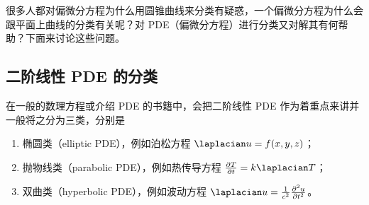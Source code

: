 
\begin{issues}
\issueMissDepend
\issueTODO
\issueDraft
\end{issues}

很多人都对偏微分方程为什么用圆锥曲线来分类有疑惑，一个偏微分方程为什么会跟平面上曲线的分类有关呢？对 PDE（偏微分方程）进行分类又对解其有何帮助？下面来讨论这些问题。

\subsection{二阶线性 PDE 的分类}
在一般的数理方程或介绍 PDE 的书籍中，会把二阶线性 PDE 作为着重点来讲并一般将之分为三类，分别是
\begin{enumerate}
\item 椭圆类（elliptic PDE），例如泊松方程 $\laplacian u = f(x,y,z)$；
\item 抛物线类（parabolic PDE），例如热传导方程 $\frac{\partial T}{\partial t} = k \laplacian T$；
\item 双曲类（hyperbolic PDE），例如波动方程 $\laplacian u = \frac{1}{c^2} \frac{\partial^2 u}{\partial t^2}$。
\end{enumerate}
